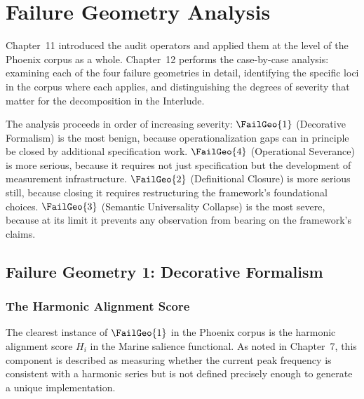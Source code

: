 
\chapter{Failure Geometry Analysis}
\label{ch:failure-geometry}


\noindent
Chapter~11 introduced the audit operators and applied them
at the level of the Phoenix corpus as a whole. Chapter~12
performs the case-by-case analysis: examining each of the
four failure geometries in detail, identifying the specific
loci in the corpus where each applies, and distinguishing
the degrees of severity that matter for the decomposition
in the Interlude.

The analysis proceeds in order of increasing severity:
$\FailGeo{1}$ (Decorative Formalism) is the most benign,
because operationalization gaps can in principle be closed
by additional specification work. $\FailGeo{4}$ (Operational
Severance) is more serious, because it requires not just
specification but the development of measurement
infrastructure. $\FailGeo{2}$ (Definitional Closure)
is more serious still, because closing it requires
restructuring the framework's foundational choices.
$\FailGeo{3}$ (Semantic Universality Collapse) is the
most severe, because at its limit it prevents any
observation from bearing on the framework's claims.

\section{Failure Geometry 1: Decorative Formalism}
\label{sec:fg1-analysis}

\subsection{The Harmonic Alignment Score}

The clearest instance of $\FailGeo{1}$ in the Phoenix
corpus is the harmonic alignment score $H_i$ in the
Marine salience functional. As noted in Chapter~7,
this component is described as measuring whether the
current peak frequency is consistent with a harmonic
series but is not defined precisely enough to generate
a unique implementation.

